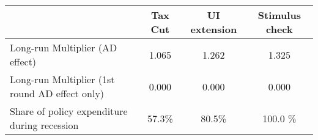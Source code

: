\begin{tabular}{@{}lccc@{}} 
\toprule 
& Tax Cut    & UI extension    & Stimulus check    \\  \midrule 
Long-run Multiplier (AD effect) &1.065  & 1.262  & 1.325     \\ 
Long-run Multiplier (1st round AD effect only) &0.000  & 0.000  & 0.000     \\ 
Share of policy expenditure during recession &57.3\%  & 80.5\%  & 100.0 \%    \\ 
\end{tabular}  
